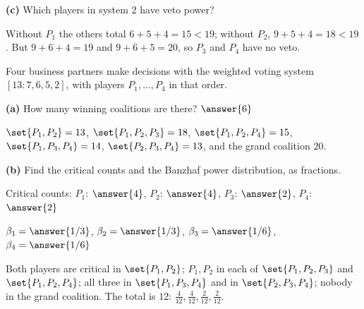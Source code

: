 \documentclass[12pt]{ximera}
\begin{document}
\begin{problem}
\begin{prompt}
\textbf{(c)} Which players in system 2 have veto power?
\begin{selectAll}
\end{selectAll}
\begin{feedback}
Without $P_1$ the others total $6+5+4=15<19$; without $P_2$, $9+5+4=18<19$. But $9+6+4=19$ and $9+6+5=20$, so $P_3$ and $P_4$ have no veto.
\end{feedback}
\end{prompt}
\end{problem}

\begin{problem}
Four business partners make decisions with the weighted voting system $[13:7,6,5,2]$, with
players $P_1,\dots,P_4$ in that order.

\begin{prompt}
\textbf{(a)} How many winning coalitions are there? $\answer{6}$
\begin{feedback}
$\set{P_1,P_2}=13$, $\set{P_1,P_2,P_3}=18$, $\set{P_1,P_2,P_4}=15$, $\set{P_1,P_3,P_4}=14$, $\set{P_2,P_3,P_4}=13$, and the grand coalition $20$.
\end{feedback}
\end{prompt}

\begin{prompt}
\textbf{(b)} Find the critical counts and the Banzhaf power distribution, as fractions.

Critical counts: $P_1$: $\answer{4}$, $P_2$: $\answer{4}$,
$P_3$: $\answer{2}$, $P_4$: $\answer{2}$

\smallskip
$\beta_1=\answer{1/3}$, $\beta_2=\answer{1/3}$,
$\beta_3=\answer{1/6}$, $\beta_4=\answer{1/6}$
\begin{feedback}
Both players are critical in $\set{P_1,P_2}$; $P_1,P_2$ in each of $\set{P_1,P_2,P_3}$ and $\set{P_1,P_2,P_4}$; all three in $\set{P_1,P_3,P_4}$ and in $\set{P_2,P_3,P_4}$; nobody in the grand coalition. The total is $12$: $\frac4{12},\frac4{12},\frac2{12},\frac2{12}$.
\end{feedback}
\end{prompt}
\end{problem}
\end{document}
